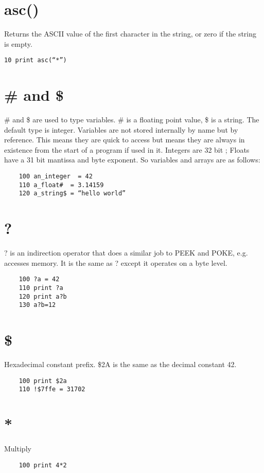 \section*{asc()}
Returns the ASCII value of the first character in the string, or zero if the string is empty.
\example{}
\begin{verbatim}
10 print asc(“*”)
\end{verbatim}

\section*{\# and \$}
\# and \$ are used to type variables. \# is a floating point value, \$ is a string. The default type is integer. Variables are not stored internally by name but by reference. This means they are quick to access but means they are always in existence from the start of a program if used in it. Integers are 32 bit ; Floats have a 31 bit mantissa and byte exponent.
So variables and arrays are as follows:
\example{}
\begin{verbatim}
	100 an_integer  = 42
	110 a_float#  = 3.14159
	120 a_string$ = “hello world”
\end{verbatim}

\section*{?}
? is an indirection operator that does a similar job to PEEK and POKE, e.g. accesses memory. It is the same as ? except it operates on a byte level.
\example{}
\begin{verbatim}
	100 ?a = 42
	110 print ?a
	120 print a?b
	130 a?b=12
\end{verbatim}

\section*{\$}
Hexadecimal constant prefix. \$2A is the same as the decimal constant 42.
\example{}
\begin{verbatim}
	100 print $2a
	110 !$7ffe = 31702
\end{verbatim}

\section*{*}
Multiply
\example{}
\begin{verbatim}
	100 print 4*2
\end{verbatim}


